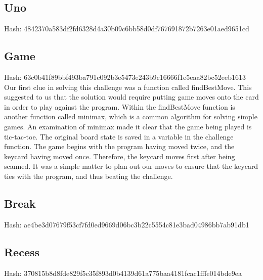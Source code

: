 \subsection{Uno}
Hash: 4842370a583df2fd6328d4a30b09c6bb58d0df767691872b7263e01aed9651cd

\subsection{Game}
Hash: 63c0b41f89bbf493ba791c092b3e5473e243b9c16666f1e5eaa82bc52eeb1613
Our first clue in solving this challenge was a function called findBestMove. This suggested to us that the solution would require putting game moves onto the card in order to play against the program. Within the findBestMove function is another function called minimax, which is a common algorithm for solving simple games. An examination of minimax made it clear that the game being played is tic-tac-toe. The original board state is saved in a variable in the challenge function. The game begins with the program having moved twice, and the keycard having moved once. Therefore, the keycard moves first after being scanned. It was a simple matter to plan out our moves to ensure that the keycard ties with the program, and thus beating the challenge. 

\subsection{Break}
Hash: ae4be3d07679f53cf7fd0ed9669d06bc3b22c5554c81e3bad04986bb7ab91db1

\subsection{Recess}
Hash: 370815b8d8fde829f5c35f893d0b4139d61a775baa4181fcac1fffe014bde9ea
